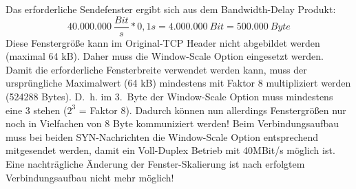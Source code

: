 Das erforderliche Sendefenster ergibt sich aus dem Bandwidth-Delay Produkt:
\[40.000.000 \ \frac{Bit}{s} * 0,1s = 4.000.000 \ Bit = 500.000 \ Byte\]
Diese Fenstergröße kann im Original-TCP Header nicht abgebildet werden (maximal 64 kB).
Daher muss die Window-Scale Option eingesetzt werden.
Damit die erforderliche Fensterbreite verwendet werden kann, muss der ursprüngliche Maximalwert (64 kB) mindestens mit Faktor 8 multipliziert werden (524288 Bytes).
D.\ h. im 3.\ Byte der Window-Scale Option muss mindestens eine 3 stehen ($2^3$ = Faktor 8).
Dadurch können nun allerdings Fenstergrößen nur noch in Vielfachen
von 8 Byte kommuniziert werden!
Beim Verbindungsaufbau muss bei beiden SYN-Nachrichten die Window-Scale Option entsprechend mitgesendet werden, damit ein Voll-Duplex Betrieb mit 40MBit/s möglich ist.
Eine nachträgliche Änderung der Fenster-Skalierung ist nach erfolgtem Verbindungsaufbau nicht mehr möglich!